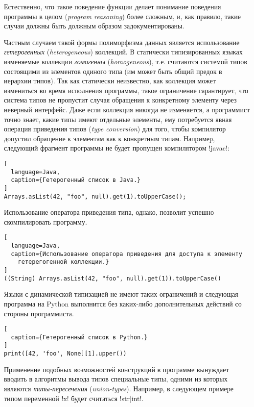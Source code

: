 Естественно, что такое поведение функции делает понимание поведения программы в
целом (\emph{program reasoning}) более сложным, и, как правило, такие случаи
должны быть должным образом задокументированы. 

Частным случаем такой формы полиморфизма данных является использование
\emph{гетерогенных} (\emph{heterogeneous}) коллекций. В статически
типизированных языках изменяемые коллекции \emph{гомогенны}
(\emph{homogeneous}), т.е. считаются системой типов состоящими из элементов
одиного типа (им может быть общий предок в иерархии типов).  Так как статически
неизвестно, как коллекция может измениться во время исполнения программы,
такое ограничение гарантирует, что система типов не пропустит случая обращения к
конкретному элементу через неверный интерфейс. Даже если коллекция никогда не
изменяется, а программист точно знает, какие типы имеют отдельные элементы, ему
потребуется явная операция приведения типов (\emph{type conversion}) для того, чтобы
компилятор допустил обращение к элементам как к конкретным типам. Например,
следующий фрагмент программы не будет пропущен компилятором !javac!:

\begin{lstlisting}[
  language=Java,
  caption={Гетерогенный список в Java.}
]
Arrays.asList(42, "foo", null).get(1).toUpperCase();
\end{lstlisting}

Использование оператора приведения типа, однако, позволит успешно скомпилировать
программу.

\begin{lstlisting}[
  language=Java,
  caption={Использование оператора приведения для доступа к элементу
    гетерегогенной коллекции.}
]
((String) Arrays.asList(42, "foo", null).get(1)).toUpperCase()
\end{lstlisting}

Языки с динамической типизацией не имеют таких ограничений и следующая программа
на Python выполнится без каких-либо дополнительных действий со стороны
программиста.

\begin{lstlisting}[
  caption={Гетерогенный список в Python.}  
]
print([42, 'foo', None][1].upper())
\end{lstlisting}

Применение подобных возможностей конструкций в программе вынуждает вводить в
алгоритмы вывода типов специальные типы, одними из которых являются
\emph{типы-пересечения} (\emph{union-types}).  Например, в следующем примере типом
переменной !x! будет считаться !str|int!.

